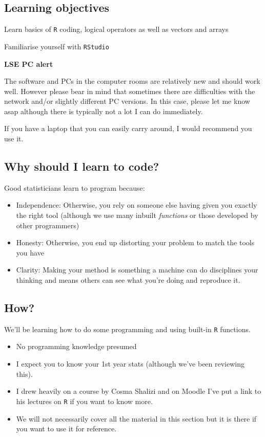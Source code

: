 \documentclass[
]{gitbook}
\providecommand{\tightlist}{%
  \setlength{\itemsep}{0pt}\setlength{\parskip}{0pt}}
\begin{document}
\hypertarget{learning-objectives}{%
\subsection{Learning objectives}\label{learning-objectives}}

Learn basics of \texttt{R} coding, logical operators as well as vectors and arrays

Familiarise yourself with \texttt{RStudio}

\textbf{LSE PC alert}

The software and PCs in the computer rooms are relatively new and should work well. However please bear in mind that sometimes there are difficulties with the network and/or slightly different PC versions. In this case, please let me know asap although there is typically not a lot I can do immediately.

If you have a laptop that you can easily carry around, I would recommend you use it.

\hypertarget{why-should-i-learn-to-code}{%
\subsection{Why should I learn to code?}\label{why-should-i-learn-to-code}}

Good statisticians learn to program because:

\begin{itemize}
\tightlist
\item
  Independence: Otherwise, you rely on someone else having given you exactly the right tool (although we use many inbuilt \emph{functions} or those developed by other programmers)
\item
  Honesty: Otherwise, you end up distorting your problem to match the tools you have
\item
  Clarity: Making your method is something a machine can do disciplines your thinking and means others can see what you're doing and reproduce it.
\end{itemize}

\hypertarget{how}{%
\subsection{How?}\label{how}}

We'll be learning how to do some programming and using built-in \texttt{R} functions.

\begin{itemize}
\tightlist
\item
  No programming knowledge presumed
\item
  I expect you to know your 1st year stats (although we've been reviewing this).
\item
  I drew heavily on a course by Cosma Shalizi and on Moodle I've put a link to his lectures on \texttt{R} if you want to know more.
\item
  We will not necessarily cover all the material in this section but it is there if you want to use it for reference.
\end{itemize}
\end{document}
